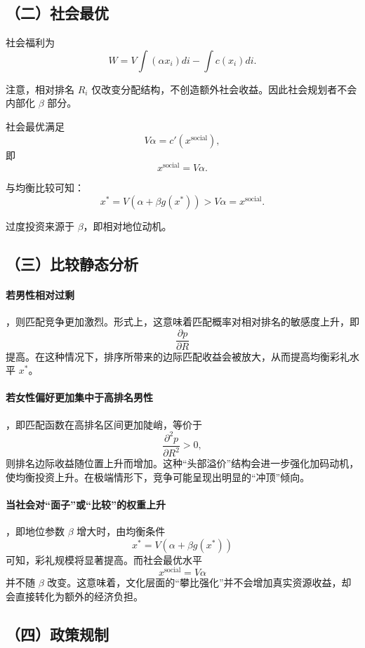 \documentclass[11pt, a4paper, UTF8]{chinese-erj}
\begin{document}
\subsection*{（二）社会最优}

社会福利为
\[
W = V \int (\alpha x_i) di - \int c(x_i) di.
\]

注意，相对排名 $R_i$ 仅改变分配结构，不创造额外社会收益。因此社会规划者不会内部化 $\beta$ 部分。

社会最优满足
\[
V \alpha = c'(x^{\text{social}}),
\]
即
\[
x^{\text{social}} = V\alpha.
\]

与均衡比较可知：
\[
x^* = V(\alpha + \beta g(x^*)) > V\alpha = x^{\text{social}}.
\]

过度投资来源于 $\beta$，即相对地位动机。

\subsection*{（三）比较静态分析}

\paragraph{若男性相对过剩}，则匹配竞争更加激烈。形式上，这意味着匹配概率对相对排名的敏感度上升，即
\[
\frac{\partial p}{\partial R}
\]
提高。在这种情况下，排序所带来的边际匹配收益会被放大，从而提高均衡彩礼水平 $x^*$。


\paragraph{若女性偏好更加集中于高排名男性}，即匹配函数在高排名区间更加陡峭，等价于
\[
\frac{\partial^2 p}{\partial R^2} > 0,
\]
则排名边际收益随位置上升而增加。这种“头部溢价”结构会进一步强化加码动机，使均衡投资上升。在极端情形下，竞争可能呈现出明显的“冲顶”倾向。

\paragraph{当社会对“面子”或“比较”的权重上升}，即地位参数 $\beta$ 增大时，由均衡条件
\[
x^* = V(\alpha + \beta g(x^*))
\]
可知，彩礼规模将显著提高。而社会最优水平
\[
x^{\text{social}} = V\alpha
\]
并不随 $\beta$ 改变。这意味着，文化层面的“攀比强化”并不会增加真实资源收益，却会直接转化为额外的经济负担。

\subsection*{（四）政策规制}
\end{document}
